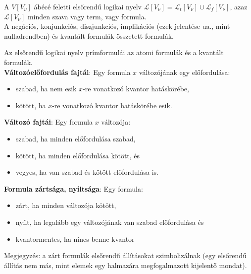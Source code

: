 \documentclass[margin=0px]{article}
\begin{document}
\noindent A $V[V_{\nu}]$ ábécé feletti elsőrendű logikai nyelv
$\mathcal{L}[V_{\nu}] = \mathcal{L}_{t}[V_{\nu}] \cup \mathcal{L}_{f}[V_{\nu}]$, azaz $\mathcal{L}[V_{\nu}]$
minden szava vagy term, vagy formula.\\

A negációs, konjunkciós, diszjunkciós, implikációs (ezek jelentése ua., mint nulladrendben) és kvantált formulák
összetett formulák.

Az elsőrendű logikai nyelv prímformulái az atomi formulák és a kvantált formulák.\\

\noindent \textbf{Változóelőfordulás fajtái}: Egy formula $x$ változójának egy előfordulása:

\begin{itemize}
    \item	szabad, ha nem esik $x$-re vonatkozó kvantor hatáskörébe,

    \item	kötött, ha $x$-re vonatkozó kvantor hatáskörébe esik.
\end{itemize}

\noindent \textbf{Változó fajtái}: Egy formula $x$ változója:

\begin{itemize}
    \item	szabad, ha minden előfordulása szabad,

    \item	kötött, ha minden előfordulása kötött, és

    \item	vegyes, ha van szabad és kötött előfordulása is.
\end{itemize}

\noindent \textbf{Formula zártsága, nyíltsága}: Egy formula:

\begin{itemize}
    \item	zárt, ha minden változója kötött,

    \item	nyílt, ha legalább egy változójának van szabad előfordulása és

    \item	kvantormentes, ha nincs benne kvantor
\end{itemize}

Megjegyzés: a zárt formulák elsőrendű állításokat szimbolizálnak (egy elsőrendű állítás nem más, mint elemek egy halmazára
megfogalmazott kijelentő mondat).
\end{document}
